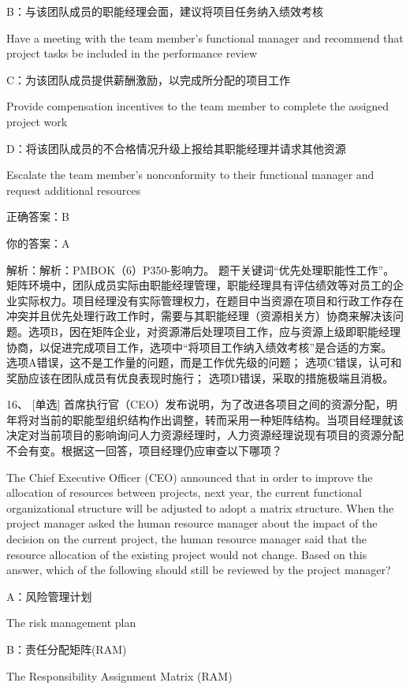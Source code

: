 B：与该团队成员的职能经理会面，建议将项目任务纳入绩效考核

Have a meeting with the team member's functional manager and recommend that project tasks be included in the performance review

C：为该团队成员提供薪酬激励，以完成所分配的项目工作

Provide compensation incentives to the team member to complete the assigned project work

D：将该团队成员的不合格情况升级上报给其职能经理并请求其他资源

Escalate the team member's nonconformity to their functional manager and request additional resources

正确答案：B

你的答案：A

解析：解析：PMBOK（6）P350-影响力。 题干关键词“优先处理职能性工作”。 矩阵环境中，团队成员实际由职能经理管理，职能经理具有评估绩效等对员工的企业实际权力。项目经理没有实际管理权力，在题目中当资源在项目和行政工作存在冲突并且优先处理行政工作时，需要与其职能经理（资源相关方）协商来解决该问题。选项B，因在矩阵企业，对资源滞后处理项目工作，应与资源上级即职能经理协商，以促进完成项目工作，选项中“将项目工作纳入绩效考核”是合适的方案。 选项A错误，这不是工作量的问题，而是工作优先级的问题； 选项C错误，认可和奖励应该在团队成员有优良表现时施行； 选项D错误，采取的措施极端且消极。


16、 [单选] 首席执行官（CEO）发布说明，为了改进各项目之间的资源分配，明年将对当前的职能型组织结构作出调整，转而采用一种矩阵结构。当项目经理就该决定对当前项目的影响询问人力资源经理时，人力资源经理说现有项目的资源分配不会有变。根据这一回答，项目经理仍应审查以下哪项？

The Chief Executive Officer (CEO) announced that in order to improve the allocation of resources between projects, next year, the current functional organizational structure will be adjusted to adopt a matrix structure. When the project manager asked the human resource manager about the impact of the decision on the current project, the human resource manager said that the resource allocation of the existing project would not change. Based on this answer, which of the following should still be reviewed by the project manager?

A：风险管理计划

The risk management plan

B：责任分配矩阵(RAM)

The Responsibility Assignment Matrix (RAM)

